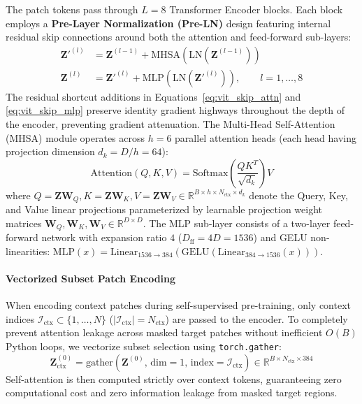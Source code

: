 \documentclass{article}
\begin{document}
The patch tokens pass through $L = 8$ Transformer Encoder blocks. Each block employs a \textbf{Pre-Layer Normalization (Pre-LN)} design featuring internal residual skip connections around both the attention and feed-forward sub-layers:
\begin{align}
    \mathbf{Z}'^{(l)} &= \mathbf{Z}^{(l-1)} + \text{MHSA}\left(\text{LN}(\mathbf{Z}^{(l-1)})\right) \label{eq:vit_skip_attn} \\
    \mathbf{Z}^{(l)} &= \mathbf{Z}'^{(l)} + \text{MLP}\left(\text{LN}(\mathbf{Z}'^{(l)})\right), \qquad l = 1, \dots, 8 \label{eq:vit_skip_mlp}
\end{align}
The residual shortcut additions in Equations~\eqref{eq:vit_skip_attn} and \eqref{eq:vit_skip_mlp} preserve identity gradient highways throughout the depth of the encoder, preventing gradient attenuation. The Multi-Head Self-Attention (MHSA) module operates across $h = 6$ parallel attention heads (each head having projection dimension $d_k = D/h = 64$):
\begin{equation}
    \text{Attention}(Q, K, V) = \text{Softmax}\left(\frac{Q K^T}{\sqrt{d_k}}\right) V
\end{equation}
where $Q = \mathbf{Z} \mathbf{W}_Q, K = \mathbf{Z} \mathbf{W}_K, V = \mathbf{Z} \mathbf{W}_V \in \mathbb{R}^{B \times h \times N_{\text{ctx}} \times d_k}$ denote the Query, Key, and Value linear projections parameterized by learnable projection weight matrices $\mathbf{W}_Q, \mathbf{W}_K, \mathbf{W}_V \in \mathbb{R}^{D \times D}$. The MLP sub-layer consists of a two-layer feed-forward network with expansion ratio $4$ ($D_{\text{ff}} = 4D = 1536$) and GELU non-linearities: $\text{MLP}(x) = \text{Linear}_{1536 \to 384}\left(\text{GELU}\left(\text{Linear}_{384 \to 1536}(x)\right)\right)$.

\paragraph{Vectorized Subset Patch Encoding}
When encoding context patches during self-supervised pre-training, only context indices $\mathcal{I}_{\text{ctx}} \subset \{1, \dots, N\}$ ($|\mathcal{I}_{\text{ctx}}| = N_{\text{ctx}}$) are passed to the encoder. To completely prevent attention leakage across masked target patches without inefficient $O(B)$ Python loops, we vectorize subset selection using \texttt{torch.gather}:
\begin{equation}
    \mathbf{Z}_{\text{ctx}}^{(0)} = \text{gather}\left(\mathbf{Z}^{(0)}, \, \text{dim}=1, \, \text{index}=\mathcal{I}_{\text{ctx}}\right) \in \mathbb{R}^{B \times N_{\text{ctx}} \times 384}
\end{equation}
Self-attention is then computed strictly over context tokens, guaranteeing zero computational cost and zero information leakage from masked target regions.
\end{document}
